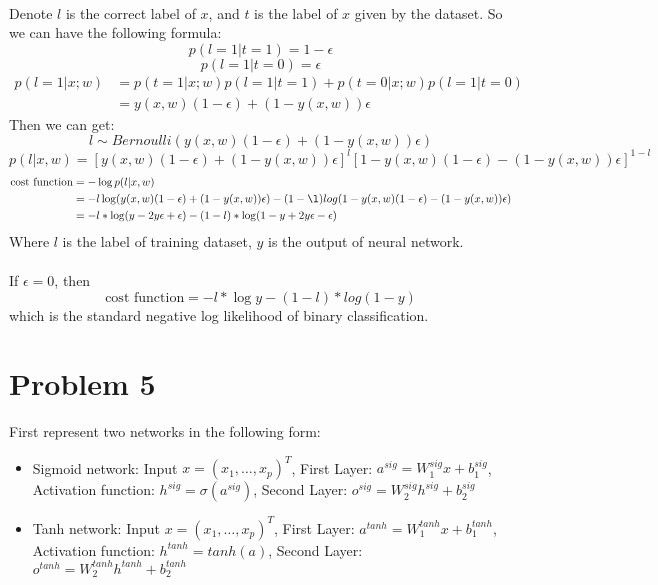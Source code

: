 \documentclass[twoside]{article}
\begin{document}
\paragraph{}Denote $l$ is the correct label of $x$, and $t$ is the label of $x$ given by the dataset.
So we can have the following formula:
$$p(l = 1 | t=1) = 1-\epsilon$$
$$p(l = 1 | t=0) = \epsilon$$
\begin{align*}
p(l=1 | x; w) &= p(t=1| x; w)p(l=1|t=1)+p(t=0| x; w)p(l=1|t=0)\\
&=y(x, w)(1-\epsilon) + (1-y(x, w))\epsilon 
\end{align*}
Then we can get:
$$l \sim Bernoulli\left(y(x, w)(1-\epsilon) + (1-y(x, w))\epsilon\right)$$
$$p(l |x, w) =\left[y(x, w)(1-\epsilon) + (1-y(x, w))\epsilon\right]^{l}[1-y(x, w)(1-\epsilon) - (1-y(x, w))\epsilon]^{1-l}$$
\begin{align*}
\text{cost function} &= - \log p(l |x, w)\\
&= - l \log(y(x, w)(1-\epsilon) + (1-y(x, w))\epsilon ) - (1-\l) log(1-y(x, w)(1-\epsilon) - (1-y(x, w))\epsilon )\\
&= -l * \log(y-2y\epsilon+\epsilon) - (1-l) * \log(1-y+2y\epsilon-\epsilon)
\end{align*}
Where $l$ is the label of training dataset, $y$ is the output of neural network.

\paragraph{} If $\epsilon=0$, then $$\text{cost function} = -l * \log y - (1-l) *log(1-y)$$ which is the standard negative log likelihood of binary classification.

\section{Problem 5}
First represent two networks in the following form:
\begin{itemize}
\item Sigmoid network: Input $x=(x_1, \dots, x_p)^T$, First Layer: $a^{sig} = W^{sig}_{1}x + b^{sig}_1$, Activation function: $h^{sig} = \sigma (a^{sig})$, Second Layer: $o^{sig} = W^{sig}_2 h^{sig} + b^{sig}_2$

\item Tanh network: Input $x=(x_1, \dots, x_p)^T$, First Layer: $a^{tanh} = W^{tanh}_{1}x + b^{tanh}_1$, Activation function: $h^{tanh} = tanh (a)$, Second Layer: $o^{tanh} = W^{tanh}_2 h^{tanh} + b^{tanh}_2$
\end{itemize}
\end{document}
